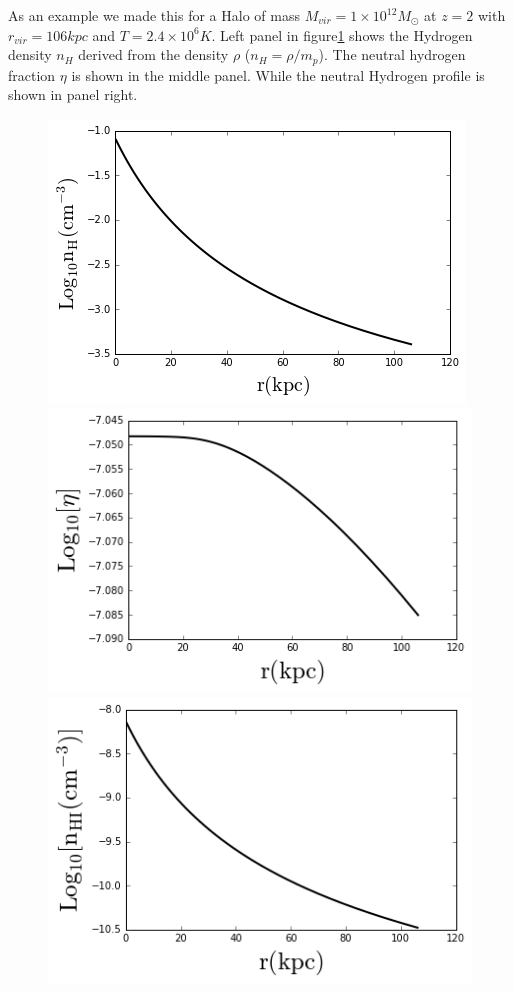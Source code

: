 \documentclass[12pt]{article}
\begin{document}
As an example we made this for a Halo of mass $M_{vir} = 1 \times
10^{12} M_{\odot}$ at $z=2$ with $r_{vir}=106kpc$ and $T =2.4\times10^{6}K$.
Left panel in figure\ref{fig:nhvsr} shows the Hydrogen density $n_H$ derived from the density $\rho$
($n_H = \rho / m_p$). The neutral hydrogen fraction $\eta$ is shown in
the middle panel. While the neutral Hydrogen profile is shown in panel
right.

\begin{figure}[H]
\centering
\includegraphics[scale=0.4]{../code/nhvsr.png}
\includegraphics[scale=0.4]{../code/etavsr.png}
\includegraphics[scale=0.4]{../code/nhivsr.png}
\caption{\label{fig:nhvsr}}
\end{figure}
\end{document}
